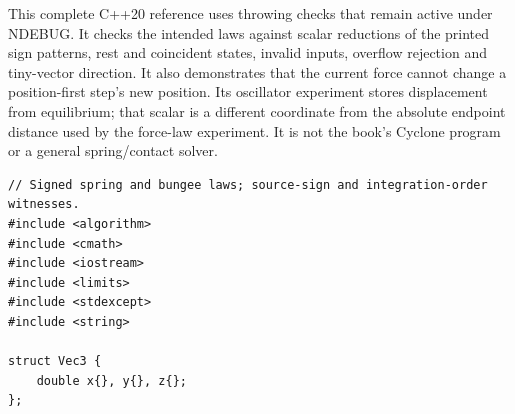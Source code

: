 This complete C++20 reference uses throwing checks that remain active under NDEBUG. It checks the intended laws against scalar reductions of the printed sign patterns, rest and coincident states, invalid inputs, overflow rejection and tiny-vector direction. It also demonstrates that the current force cannot change a position-first step's new position. Its oscillator experiment stores displacement from equilibrium; that scalar is a different coordinate from the absolute endpoint distance used by the force-law experiment. It is not the book's Cyclone program or a general spring/contact solver.

\begin{verbatim}
// Signed spring and bungee laws; source-sign and integration-order witnesses.
#include <algorithm>
#include <cmath>
#include <iostream>
#include <limits>
#include <stdexcept>
#include <string>

struct Vec3 {
    double x{}, y{}, z{};
};


\end{verbatim}
